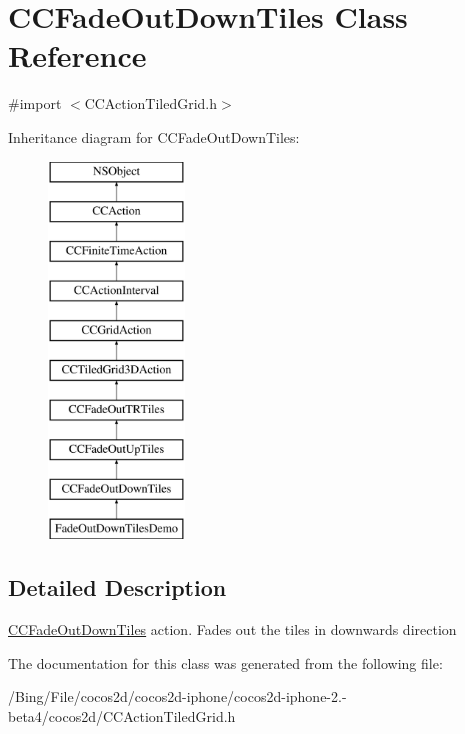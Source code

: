 \hypertarget{interface_c_c_fade_out_down_tiles}{\section{C\-C\-Fade\-Out\-Down\-Tiles Class Reference}
\label{interface_c_c_fade_out_down_tiles}
}


{\ttfamily \#import $<$C\-C\-Action\-Tiled\-Grid.\-h$>$}

Inheritance diagram for C\-C\-Fade\-Out\-Down\-Tiles\-:\begin{figure}[H]
\begin{center}
\leavevmode
\includegraphics[height=10.000000cm]{interface_c_c_fade_out_down_tiles}
\end{center}
\end{figure}


\subsection{Detailed Description}
\hyperlink{interface_c_c_fade_out_down_tiles}{C\-C\-Fade\-Out\-Down\-Tiles} action. Fades out the tiles in downwards direction 

The documentation for this class was generated from the following file\-:\begin{DoxyCompactItemize}
\item 
/\-Bing/\-File/cocos2d/cocos2d-\/iphone/cocos2d-\/iphone-\/2.-\/beta4/cocos2d/C\-C\-Action\-Tiled\-Grid.\-h\end{DoxyCompactItemize}
